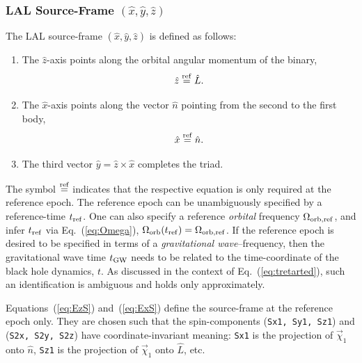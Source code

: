 \documentclass[11pt,tightenlines,article,amssymb,amsmath,amsfonts,superscriptaddress,nofootinbib]{revtex4}
\newcommand{\nNR}{\hat{n}}
\newcommand{\lNR}{\hat L}
\newcommand{\tGW}{t_{\rm GW}}
\newcommand{\ExS}{{{\hat x}}}
\newcommand{\EyS}{{{\hat y}}}
\newcommand{\EzS}{{{\hat z}}}
\newcommand{\phiRef}{\Phi} %
\newcommand{\equalref}{\overset{\rm ref}{=}}
\begin{document}
\subsubsection{LAL Source-Frame \boldmath$(\ExS, \EyS, \EzS)$}


The LAL source-frame $(\ExS, \EyS, \EzS)$ is defined as follows:
\begin{enumerate}
\item The $\EzS$-axis points along the orbital angular momentum of the binary,
  \begin{equation}\label{eq:EzS}
    \EzS\equalref \lNR.
  \end{equation}
\item The $\ExS$-axis points along the vector $\nNR$ pointing from the second
  to the first body,
  \begin{equation}\label{eq:ExS}
    \ExS\equalref\nNR.
  \end{equation}
\item The third vector $\EyS=\EzS\times\ExS$ completes the triad.
\end{enumerate}
The symbol $\equalref$ indicates that the
respective equation is only required at the reference epoch.  The
reference epoch can be unambiguously specified by a reference-time
$t_{\rm ref}$.  One can also specify a reference \emph{orbital}
frequency $\Omega_{\rm orb,ref}$, and infer $t_{\rm ref}$ via
Eq.~(\ref{eq:Omega}), $\Omega_{\rm orb}(t_{\rm ref})=\Omega_{\rm orb, ref}$.  If the
reference epoch is desired to be specified in terms of a
\emph{gravitational wave}--frequency, then the gravitational wave time
$\tGW$ needs to be related to the time-coordinate of the black hole
dynamics, $t$.  As discussed in the context of
Eq.~(\ref{eq:tretarted}), such an identification is ambiguous and
holds only approximately.

Equations~(\ref{eq:EzS}) and~(\ref{eq:ExS}) define the source-frame at
the reference epoch only.  They are chosen such that the
spin-components ({\tt Sx1, Sy1, Sz1}) and ({\tt S2x, S2y, S2z}) have
coordinate-invariant meaning: {\tt Sx1} is the projection of
$\vec\chi_1$ onto $\nNR$, {\tt Sz1} is the projection of $\vec\chi_1$
onto $\lNR$, etc.
\end{document}
